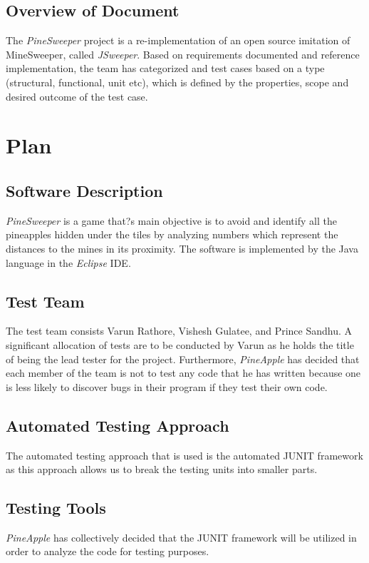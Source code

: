 \documentclass[12pt, titlepage]{article}
\begin{document}
\bigskip
\subsection{Overview of Document}
The \textit{PineSweeper} project is a re-implementation of an open source imitation of MineSweeper, called \textit{JSweeper}. Based on
requirements documented and reference implementation, the team has categorized and test cases based on a type (structural,
functional, unit etc), which is defined by the properties, scope and desired outcome of the test case. 

\newpage
\section{Plan}
\subsection{Software Description}
\textit{PineSweeper} is a game that?s main objective is to avoid and identify all the pineapples hidden under the tiles by analyzing
numbers which represent the distances to the mines in its proximity. The software is implemented by the Java language in the
\textit{Eclipse} IDE.

\subsection{Test Team}
The test team consists Varun Rathore, Vishesh Gulatee, and Prince Sandhu. A significant allocation of tests are to be conducted by Varun as he holds the title of being the lead tester for the project. Furthermore, \textit{PineApple} has decided that each member of the
team is not to test any code that he has written because one is less likely to discover bugs in their program if they test their own code.

\subsection{Automated Testing Approach}
The automated testing approach that is used is the automated JUNIT framework as this approach allows us to break the testing units into smaller parts.

\subsection{Testing Tools}
\textit{PineApple} has collectively decided that the JUNIT framework will be utilized in order to analyze the code for testing purposes. 
\end{document}
